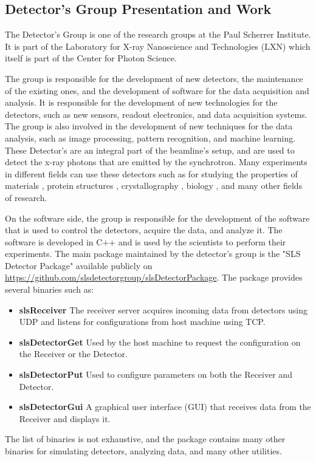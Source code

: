\begin{spacing}{1.2}
    \section{Detector's Group Presentation and Work}
    The Detector's Group is one of the research groups at the Paul Scherrer Institute. It is part of the Laboratory for X-ray Nanoscience and Technologies (LXN) which itself
    is part of the Center for Photon Science.

    The group is responsible for the development of new detectors, the maintenance of the existing ones, and the
    development of software for the data acquisition and analysis. It is responsible for the development
    of new technologies for the detectors, such as new sensors, readout electronics, and data acquisition systems.
    The group is also involved in the development of new techniques for the data analysis, such as image processing,
    pattern recognition, and machine learning.
    These Detector's are an integral part of the beamline's setup, and are used to detect the x-ray photons that are
    emitted by the synchrotron. Many experiments in different fields can use these detectors such as for studying the properties of materials \cite{butcher2024ptychographic},
    protein structures \cite{pomeranz2009crystal}, crystallography \cite{leonarski2023kilohertz}, biology \cite{lemcoff2023brilliant,dullin2024vivo}, and many other fields of research.

    On the software side, the group is responsible for the development of the software that is used to control the detectors, acquire the data, and analyze it.
    The software is developed in C++ and is used by the scientists to perform their experiments.
    The main package maintained by the detector's group is the "SLS Detector Package" available publicly
    on \url{https://github.com/slsdetectorgroup/slsDetectorPackage}. The package provides several binaries such as:
    \begin{itemize}
        \item \textbf{slsReceiver} The receiver server acquires incoming data from detectors using UDP and listens for configurations from host machine using TCP.
        \item \textbf{slsDetectorGet} Used by the host machine to request the configuration on the Receiver or the Detector.
        \item \textbf{slsDetectorPut} Used to configure parameters on both the Receiver and Detector.
        \item \textbf{slsDetectorGui} A graphical user interface (GUI) that receives data from the Receiver and displays it.
    \end{itemize}
    The list of binaries is not exhaustive, and the package contains many other binaries for simulating detectors, analyzing data, and many other utilities.


\end{spacing}
